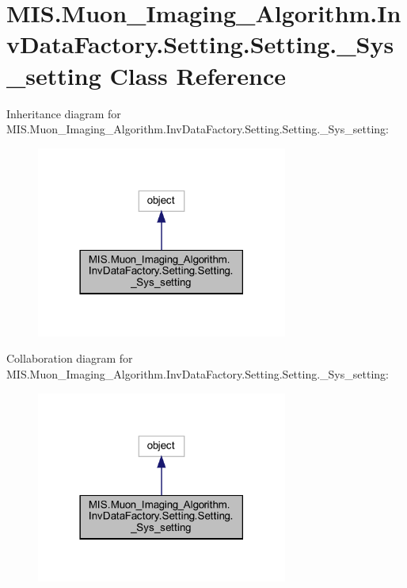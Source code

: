 \hypertarget{classMIS_1_1Muon__Imaging__Algorithm_1_1InvDataFactory_1_1Setting_1_1Setting_1_1__Sys__setting}{}\section{M\+I\+S.\+Muon\+\_\+\+Imaging\+\_\+\+Algorithm.\+Inv\+Data\+Factory.\+Setting.\+Setting.\+\_\+\+Sys\+\_\+setting Class Reference}
\label{classMIS_1_1Muon__Imaging__Algorithm_1_1InvDataFactory_1_1Setting_1_1Setting_1_1__Sys__setting}


Inheritance diagram for M\+I\+S.\+Muon\+\_\+\+Imaging\+\_\+\+Algorithm.\+Inv\+Data\+Factory.\+Setting.\+Setting.\+\_\+\+Sys\+\_\+setting\+:
\nopagebreak
\begin{figure}[H]
\begin{center}
\leavevmode
\includegraphics[width=234pt]{classMIS_1_1Muon__Imaging__Algorithm_1_1InvDataFactory_1_1Setting_1_1Setting_1_1__Sys__setting__inherit__graph}
\end{center}
\end{figure}


Collaboration diagram for M\+I\+S.\+Muon\+\_\+\+Imaging\+\_\+\+Algorithm.\+Inv\+Data\+Factory.\+Setting.\+Setting.\+\_\+\+Sys\+\_\+setting\+:
\nopagebreak
\begin{figure}[H]
\begin{center}
\leavevmode
\includegraphics[width=234pt]{classMIS_1_1Muon__Imaging__Algorithm_1_1InvDataFactory_1_1Setting_1_1Setting_1_1__Sys__setting__coll__graph}
\end{center}
\end{figure}
